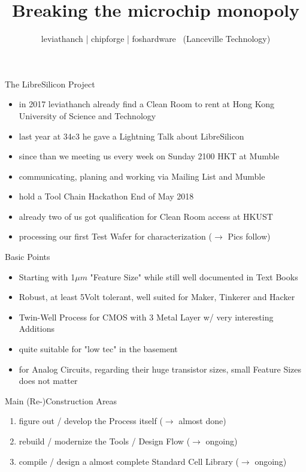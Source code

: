 \documentclass[aspectratio=169]{beamer}
\author{leviathanch | chipforge | foshardware \ (Lanceville Technology)}
\title{Breaking the microchip monopoly}
\begin{document}

\section[Introduction]{}
\begin{frame}{The LibreSilicon Project}
	\begin{itemize}
		\item in 2017 leviathanch already find a Clean Room to rent at Hong Kong University of Science and Technology
		\item last year at 34c3 he gave a Lightning Talk about LibreSilicon
		\item since than we meeting us every week on Sunday 2100 HKT at Mumble
		\item communicating, planing and working via Mailing List and Mumble
		\item hold a Tool Chain Hackathon End of May 2018
		\item already two of us got qualification for Clean Room access at HKUST
		\item processing our first Test Wafer for characterization ($\rightarrow$ Pics follow)
	\end{itemize}
\end{frame}

\begin{frame}{Basic Points}
	\begin{itemize}
        \setlength\itemsep{1em}
		\item Starting with 1$\mu m$ "Feature Size" while still well documented in Text Books
		\item Robust, at least 5Volt tolerant, well suited for Maker, Tinkerer and Hacker
		\item Twin-Well Process for CMOS with 3 Metal Layer w/ very interesting Additions
		\item quite suitable for "low tec" in the basement
		\item for Analog Circuits, regarding their huge transistor sizes, small Feature Sizes does not matter
	\end{itemize}
\end{frame}

\begin{frame}{Main (Re-)Construction Areas}
	\begin{enumerate}
		\item figure out / develop the Process itself ($\rightarrow$ almost done)
		\item rebuild / modernize the Tools / Design Flow ($\rightarrow$ ongoing)
		\item compile / design a almost complete Standard Cell Library ($\rightarrow$ ongoing)
	\end{enumerate}
\end{frame}
\end{document}

